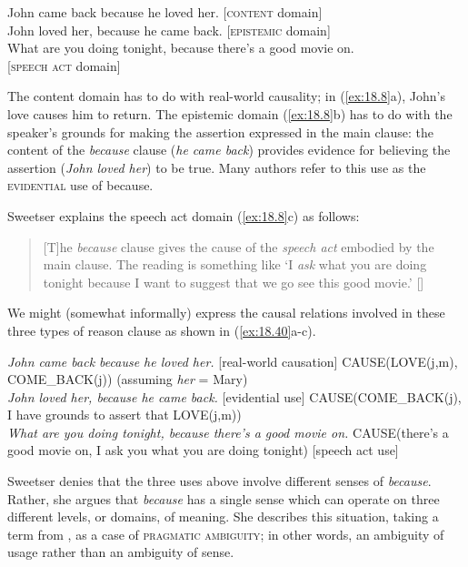 \ea \label{ex:18.8}
\ea  John came back because he loved her.  \hfill  [\textsc{content} domain]\\
\ex John loved her, because he came back. \hfill   [\textsc{epistemic} domain]\\
\ex What are you doing tonight, because there’s a good movie on. \\
\hfill [\textsc{speech act} domain]
                       \z
\z


The content domain has to do with real-world causality; in (\ref{ex:18.8}a), John’s love causes him to return. The epistemic domain (\ref{ex:18.8}b) has to do with the speaker’s grounds for making the assertion expressed in the main clause: the content of the \textit{because} clause (\textit{he came back}) provides evidence for believing the assertion (\textit{John loved her}) to be true. Many authors refer to this use as the \textsc{evidential} use of because.


Sweetser explains the speech act domain (\ref{ex:18.8}c) as follows:


\begin{quote}
{}[T]he \textit{because} clause gives the cause of the \textit{speech act} embodied by the main clause. The reading is something like ‘I \textit{ask} what you are doing tonight because I want to suggest that we go see this good movie.’ [\citeyear[77]{Sweetser1990}]
\end{quote}


We might (somewhat informally) express the causal relations involved in these three types of reason clause as shown in (\ref{ex:18.40}a-c).


\ea \label{ex:18.40}
\ea  \textit{John came back because he loved her.}  \hfill  [real-world causation]
CAUSE(LOVE(j,m), COME\_BACK(j))  \hfill (assuming \textit{her} = Mary)\\
\ex \textit{John loved her, because he came back.} \hfill   [evidential use] 
CAUSE(COME\_BACK(j), I have grounds to assert that LOVE(j,m))\\
\ex \textit{What are you doing tonight, because there’s a good movie on.}
\newline
CAUSE(there’s a good movie on, I ask you what you are doing tonight) 
\hfill [speech act use]
                       \z
\z


Sweetser denies that the three uses above involve different senses of \textit{because}. Rather, she argues that \textit{because} has a single sense which can operate on three different levels, or domains, of meaning. She describes this situation, taking a term from \citet{Horn1985}, as a case of \textsc{pragmatic ambiguity}; in other words, an ambiguity of usage rather than an ambiguity of sense.



